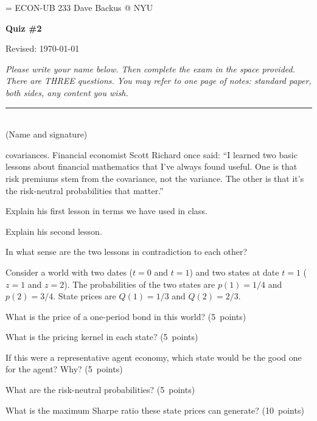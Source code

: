 \documentclass[11pt]{exam}
\begin{document}
\parskip=\bigskipamount
\parindent=0.0in
\thispagestyle{empty}
{\large ECON-UB 233 \hfill Dave Backus @ NYU}

\bigskip\bigskip
\centerline{\Large \bf Quiz \#2}
\centerline{Revised: \today}

\bigskip
{\it Please write your name below.
Then complete the exam in the space provided.
There are THREE questions.
You may refer to one page of notes:
standard paper, both sides, any content you wish.}

\bigskip
\begin{flushleft}
\rule{4in}{0.5pt} \\ (Name and signature)
\end{flushleft}

\begin{questions}
\item covariances.
Financial economist Scott Richard once said:
``I learned two basic lessons about financial mathematics
that I've always found useful.
One is that risk premiums stem from the covariance, not the variance.
The other is that it's the risk-neutral probabilities that matter.''
\begin{parts}
\item Explain his first lesson in terms we have used in class.
\item Explain his second lesson. 
\item In what sense are the two lessons in contradiction to each other?  
\end{parts}

Consider a world with two dates ($t=0$ and $t=1$)
and two states at date $t=1$ ($z=1$ and $z=2$).
The probabilities of the two states are $p(1) = 1/4$ and $p(2) = 3/4$.
State prices are $Q(1) = 1/3$ and $Q(2) = 2/3$.
%
\begin{parts}
\item What is the price of a one-period bond in this world?
(5~points)
\item What is the pricing kernel in each state?
(5~points)
\item If this were a representative agent economy,
which state would be the good one for the agent?
Why?
(5~points)
\item What are the risk-neutral probabilities?
(5~points)
\item What is the maximum Sharpe ratio these state prices can generate?
(10~points)
\end{parts}


\end{questions}
\end{document}
